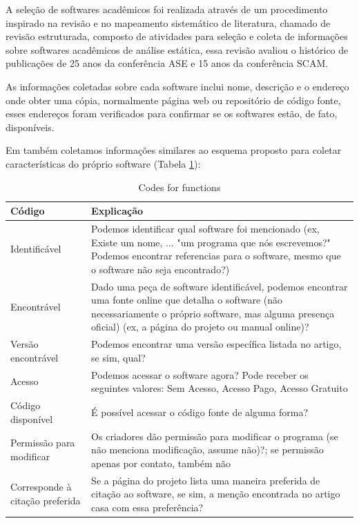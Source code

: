 A seleção de softwares acadêmicos foi realizada através de um procedimento
inspirado na revisão e no mapeamento sistemático de literatura, chamado de
revisão estruturada, composto de atividades para seleção e coleta de
informações sobre softwares acadêmicos de análise estática, essa revisão
avaliou o histórico de publicações de 25 anos da conferência ASE e 15 anos da
conferência SCAM.

As informações coletadas sobre cada software inclui nome, descrição e o
endereço onde obter uma cópia, normalmente página web ou repositório de código
fonte, esses endereços foram verificados para confirmar se os softwares estão,
de fato, disponíveis.

Em \cite{howison2016software} também coletamos informações similares ao esquema
proposto para coletar características do próprio software (Tabela
\ref{codes-for-functions}):

\begin{table}[h]
\caption{Codes for functions \cite{howison2016software}}
\centering
\begin{tabular}{ l p{8cm} }
  \hline
  Código                          & Explicação \\
  \hline
  Identificável                   & Podemos identificar qual software foi mencionado (ex, Existe um nome, ... "um programa que nós escrevemos?" Podemos encontrar referencias para o software, mesmo que o software não seja encontrado?) \\
  Encontrável                     & Dado uma peça de software identificável, podemos encontrar uma fonte online que detalha o software (não necessariamente o próprio software, mas alguma presença oficial) (ex, a página do projeto ou manual online)? \\
  Versão encontrável              & Podemos encontrar uma versão específica listada no artigo, se sim, qual? \\
  Acesso                          & Podemos acessar o software agora? Pode receber os seguintes valores: Sem Acesso, Acesso Pago, Acesso Gratuito \\
  Código disponível               & É possível acessar o código fonte de alguma forma? \\
  Permissão para modificar        & Os criadores dão permissão para modificar o programa (se não menciona modificação, assume não)?; se permissão apenas por contato, também não \\
  Corresponde à citação preferida & Se a página do projeto lista uma maneira preferida de citação ao software, se sim, a menção encontrada no artigo casa com essa preferência? \\
  \hline
\end{tabular}
\label{codes-for-functions}
\end{table}

